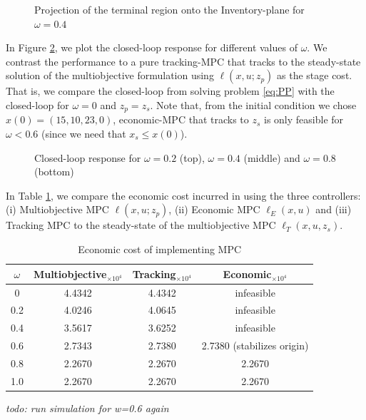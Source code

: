 \documentclass[10pt]{article}
\theoremstyle{definition}
\begin{document}
\begin{figure}
\centering
\scriptsize
\resizebox{0.75\textwidth}{!}{}
\caption{Projection of the terminal region onto the Inventory-plane
  for $\omega = 0.4$}
\label{fig:Xf4}
\end{figure}


In Figure \ref{fig:CL}, we plot the closed-loop response for different
values of $\omega$. We contrast the performance to a pure tracking-MPC
that tracks to the steady-state solution of the multiobjective
formulation using $\ell(x,u;z_p)$ as the stage cost. That is, we
compare the closed-loop from solving problem \eqref{eq:PP} with the
closed-loop for $\omega = 0$ and $z_p = z_s$. Note that, from the
initial condition we chose $x(0) = (15,10,23,0)$, economic-MPC that
tracks to $z_s$ is only feasible for $\omega < 0.6$ (since we need
that $x_s \leq x(0)$).  

\begin{figure}
\centering
\scriptsize
\resizebox{\textwidth}{!}{}
\resizebox{\textwidth}{!}{}
\resizebox{\textwidth}{!}{}
\caption{Closed-loop response for $\omega = 0.2$ (top), $\omega = 0.4$
(middle) and $\omega = 0.8$ (bottom)}
\label{fig:CL}
\end{figure}

In Table \ref{tab:CL}, we compare the economic cost incurred in using
the three controllers: (i) Multiobjective MPC $\ell(x,u;z_p)$, (ii)
Economic MPC $\ell_E(x,u)$ and (iii) Tracking MPC to the steady-state
of the multiobjective MPC $\ell_T(x,u,z_s)$. 

\begin{table}
\caption{Economic cost of implementing MPC}
\label{tab:CL}
\begin{center}
\begin{tabular}{cccc}\toprule
$\omega$ & Multiobjective$ _{ \times 10^{4}}$ & Tracking$ _{ \times 10^{4}}$ & Economic$ _{ \times 10^{4}}$ \\
\midrule
0 & 4.4342 & 4.4342 & infeasible \\
0.2 & 4.0246 & 4.0645 & infeasible \\
0.4 & 3.5617 & 3.6252 & infeasible \\
0.6 & 2.7343 & 2.7380 & 2.7380 (stabilizes origin) \\
0.8 & 2.2670 & 2.2670 & 2.2670 \\
1.0 & 2.2670 & 2.2670 & 2.2670 \\
\bottomrule
\end{tabular}
\end{center}
\end{table}
{\em{todo: run simulation for w=0.6 again}}
\end{document}
